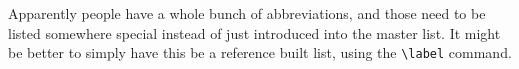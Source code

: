 Apparently people have a whole bunch of abbreviations, and those need to be listed somewhere special instead of just introduced into the master list. It might be better to simply have this be a reference built list, using the \verb|\label| command.